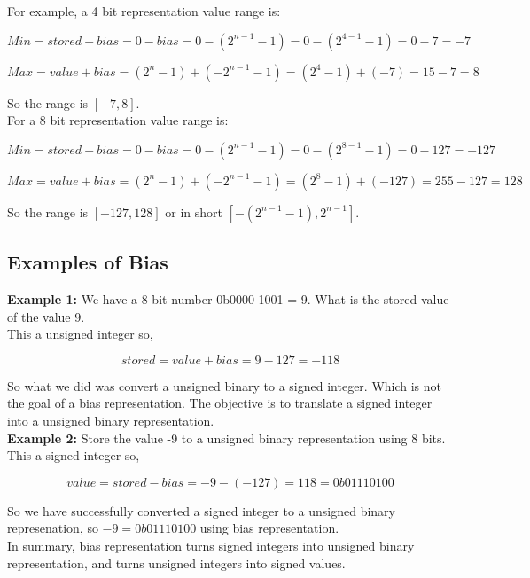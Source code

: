 \documentclass{article}
\begin{document}
\noindent For example, a 4 bit representation value range is:

\[
Min = stored - bias = 0 - bias = 0 - (2^{n-1} - 1) = 0 - (2^{4-1} - 1) = 0 - 7 = -7
\]

\[
Max = value + bias = (2^{n} - 1) + (-2^{n-1} - 1) = (2^{4} - 1) + (-7) = 15 - 7 = 8
\]

\noindent So the range is $[-7,8]$. \\

\noindent For a 8 bit representation value range is:

\[
Min = stored - bias = 0 - bias = 0 - (2^{n-1} - 1) = 0 - (2^{8-1} - 1) = 0 - 127 = -127
\]

\[
Max = value + bias = (2^{n} - 1) + (-2^{n-1} - 1) = (2^{8} - 1) + (-127) = 255 - 127 = 128
\]

\noindent So the range is $[-127,128]$ or in short $[-(2^{n-1} - 1), 2^{n-1}]$. \\

\subsection*{Examples of Bias}

\textbf{Example 1:} We have a 8 bit number 0b0000 1001 = 9. What is the stored value of the value 9. \\

This a unsigned integer so, 

\[
stored = value + bias = 9 - 127 = -118
\]

So what we did was convert a unsigned binary to a signed integer. Which is not the goal of a bias representation. The 
objective is to translate a signed integer into a unsigned binary representation. \\

\noindent \textbf{Example 2:} Store the value -9 to a unsigned binary representation using 8 bits. \\ 

This a signed integer so, 

\[
value = stored - bias = -9 -(-127) = 118 = 0b0111 0100
\]

So we have successfully converted a signed integer to a unsigned binary represenation, so $-9 = 0b0111 0100$ using bias 
representation. \\

\noindent In summary, bias representation turns signed integers into unsigned binary representation, and turns unsigned 
integers into signed values.
\end{document}
